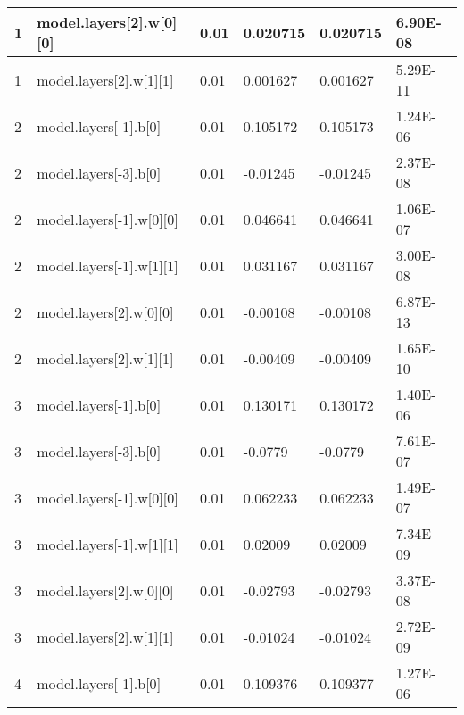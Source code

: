 \documentclass{article} %
\begin{document}
\begin{table}[]
\begin{tabular}{|l|l|l|l|l|l|}
1              & model.layers{[}2{]}.w{[}0{]}{[}0{]}  & 0.01             & 0.020715          & 0.020715        & 6.90E-08       \\ \hline
1              & model.layers{[}2{]}.w{[}1{]}{[}1{]}  & 0.01             & 0.001627          & 0.001627        & 5.29E-11       \\ \hline
2              & model.layers{[}-1{]}.b{[}0{]}        & 0.01             & 0.105172          & 0.105173        & 1.24E-06       \\ \hline
2              & model.layers{[}-3{]}.b{[}0{]}        & 0.01             & -0.01245          & -0.01245        & 2.37E-08       \\ \hline
2              & model.layers{[}-1{]}.w{[}0{]}{[}0{]} & 0.01             & 0.046641          & 0.046641        & 1.06E-07       \\ \hline
2              & model.layers{[}-1{]}.w{[}1{]}{[}1{]} & 0.01             & 0.031167          & 0.031167        & 3.00E-08       \\ \hline
2              & model.layers{[}2{]}.w{[}0{]}{[}0{]}  & 0.01             & -0.00108          & -0.00108        & 6.87E-13       \\ \hline
2              & model.layers{[}2{]}.w{[}1{]}{[}1{]}  & 0.01             & -0.00409          & -0.00409        & 1.65E-10       \\ \hline
3              & model.layers{[}-1{]}.b{[}0{]}        & 0.01             & 0.130171          & 0.130172        & 1.40E-06       \\ \hline
3              & model.layers{[}-3{]}.b{[}0{]}        & 0.01             & -0.0779           & -0.0779         & 7.61E-07       \\ \hline
3              & model.layers{[}-1{]}.w{[}0{]}{[}0{]} & 0.01             & 0.062233          & 0.062233        & 1.49E-07       \\ \hline
3              & model.layers{[}-1{]}.w{[}1{]}{[}1{]} & 0.01             & 0.02009           & 0.02009         & 7.34E-09       \\ \hline
3              & model.layers{[}2{]}.w{[}0{]}{[}0{]}  & 0.01             & -0.02793          & -0.02793        & 3.37E-08       \\ \hline
3              & model.layers{[}2{]}.w{[}1{]}{[}1{]}  & 0.01             & -0.01024          & -0.01024        & 2.72E-09       \\ \hline
4              & model.layers{[}-1{]}.b{[}0{]}        & 0.01             & 0.109376          & 0.109377        & 1.27E-06       \\ \hline

\end{tabular}
\end{table}
\end{document}
